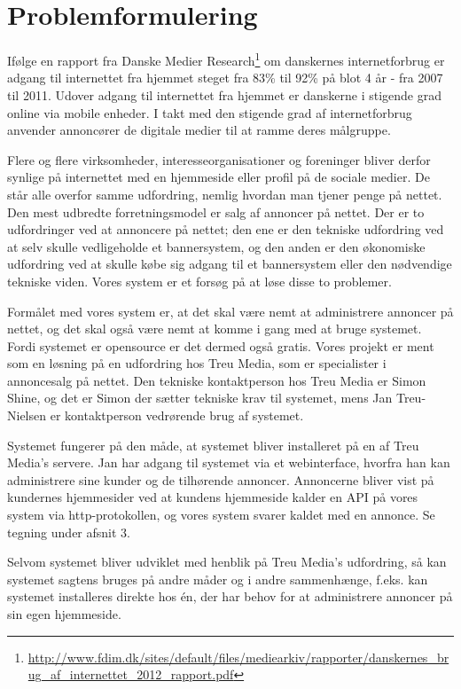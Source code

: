 \documentclass[a4paper,12pt]{article}
\begin{document}
\section{Problemformulering}

Ifølge en rapport fra Danske Medier Research\footnote{\url{ http://www.fdim.dk/sites/default/files/mediearkiv/rapporter/danskernes\_brug\_af\_internettet\_2012\_rapport.pdf}} om danskernes internetforbrug er adgang til internettet fra hjemmet steget fra 83\% til 92\% på blot 4 år - fra 2007 til 2011. Udover adgang til internettet fra hjemmet er danskerne i stigende grad online via mobile enheder. I takt med den stigende grad af internetforbrug anvender annoncører de digitale medier til at ramme deres målgruppe.

Flere og flere virksomheder, interesseorganisationer og foreninger bliver derfor synlige på internettet med en hjemmeside eller profil på de sociale medier. De står alle overfor samme udfordring, nemlig hvordan man tjener penge på nettet. Den mest udbredte forretningsmodel er salg af annoncer på nettet. Der er to udfordringer ved at annoncere på nettet; den ene er den tekniske udfordring ved at selv skulle vedligeholde et bannersystem, og den anden er den økonomiske udfordring ved at skulle købe sig adgang til et bannersystem eller den nødvendige tekniske viden. Vores system er et forsøg på at løse disse to problemer.

Formålet med vores system er, at det skal være nemt at administrere annoncer på nettet, og det skal også være nemt at komme i gang med at bruge systemet. Fordi systemet er opensource er det dermed også gratis. Vores projekt er ment som en løsning på en udfordring hos Treu Media, som er specialister i annoncesalg på nettet. Den tekniske kontaktperson hos Treu Media er Simon Shine, og det er Simon der sætter tekniske krav til systemet, mens Jan Treu-Nielsen er kontaktperson vedrørende brug af systemet.

Systemet fungerer på den måde, at systemet bliver installeret på en af Treu Media's servere. Jan har adgang til systemet via et webinterface, hvorfra han kan administrere sine kunder og de tilhørende annoncer. Annoncerne bliver vist på kundernes hjemmesider ved at kundens hjemmeside kalder en API på vores system via http-protokollen, og vores system svarer kaldet med en annonce. Se tegning under afsnit 3.

Selvom systemet bliver udviklet med henblik på Treu Media's udfordring, så kan systemet sagtens bruges på andre måder og i andre sammenhænge, f.eks. kan systemet installeres direkte hos én, der har behov for at administrere annoncer på sin egen hjemmeside.
\end{document}
